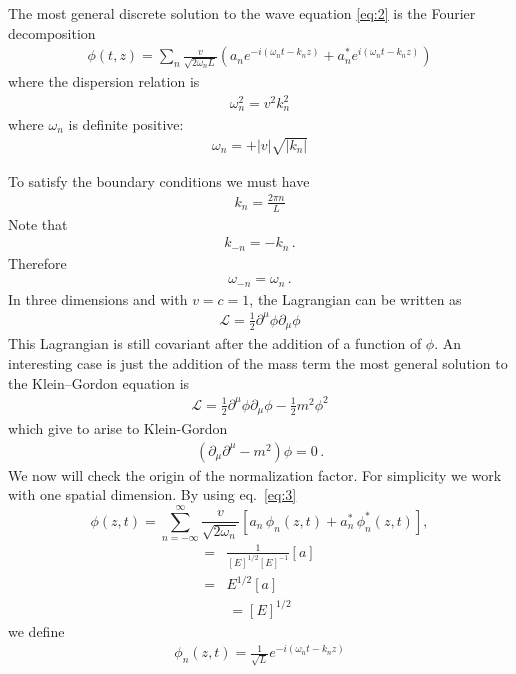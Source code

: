\begin{frame}
The most general discrete solution to the wave equation  \eqref{eq:2} is the Fourier decomposition
\begin{align}
  \label{eq:3}
  \phi(t,z)=\sum_{n}\frac{v}{\sqrt{2\omega_{n} L}}
  \left(a_{n} e^{-i (\omega_n t-k_nz) }+a_{n}^* e^{i (\omega_n t-k_n z) }\right)
\end{align}
where the dispersion relation is
\begin{align}
\label{eq:4}
  \omega_n^2=v^2 k_n^2
\end{align}
where $\omega_n$ is definite positive:
\begin{align}
  \omega_n=+|v|\sqrt{|k_n|}
\end{align}

To satisfy the boundary conditions we must have
\begin{align}
  \label{eq:5}
  k_n=\frac{2\pi n}{L}
\end{align}
Note that
\begin{align}
  k_{-n}=-k_n\,.
\end{align}
Therefore
\begin{align}
  \omega_{-n}=\omega_n\,.
\end{align}
In three dimensions and with $v=c=1$, the Lagrangian can be written as
\begin{align}
\mathcal{L}=  \tfrac{1}{2}\partial^\mu\phi\partial_\mu\phi
\end{align}
This Lagrangian is still covariant after the addition of a function of $\phi$. An interesting case is just the addition of the mass term
the most general solution to the Klein--Gordon equation is 
\begin{align}
\mathcal{L}=  \tfrac{1}{2}\partial^\mu\phi\partial_\mu\phi-\tfrac{1}{2}m^2\phi^2
\end{align}
which give to arise to Klein-Gordon 
\begin{align}
  \left(\partial_\mu\partial^\mu-m^2\right)\phi=0\,.
\end{align}
We now will check the origin of the normalization factor. For simplicity we work with one spatial dimension. By using eq.~\eqref{eq:3}
\begin{equation}
\label{eq:6}
   \phi(z,t)=\sum_{n=-\infty}^\infty 
    \frac{v}{\sqrt{2\omega_n}}
  \left[a_n\,\phi_n(z,t)+a_n^*\,\phi_n^*(z,t)\right],
\end{equation}
\begin{align}
  [E]=&\frac{1}{[E]^{1/2}[E]^{-1}}[a]\nonumber\\
  =&E^{1/2}[a]
\end{align}
\begin{align}
  [a]=[E]^{1/2}
\end{align}
we define
\begin{align}
  \phi_n(z,t)=\frac{1}{\sqrt{L}}e^{-i(\omega_n t-k_n z)}
\end{align}


\end{frame}
